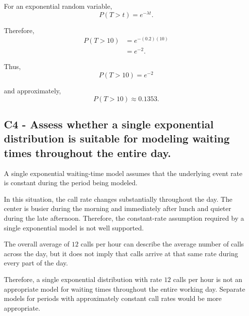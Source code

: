 {	For an exponential random variable,
	\[
	P(T>t)=e^{-\lambda t}.
	\]
	
	Therefore,
	\[
	\begin{aligned}
		P(T>10)
		&=e^{-(0.2)(10)}\\
		&=e^{-2}.
	\end{aligned}
	\]
	
	Thus,
	\[
	\boxed{
		P(T>10)=e^{-2}
	}
	\]
	
	and approximately,
	\[
	P(T>10)\approx0.1353.
	\]
	

	\label{subsec:technical-support-waiting-time-c4-c}
	\subsection*{C4 - Assess whether a single exponential distribution is suitable for modeling waiting times throughout the entire day. }
	
	A single exponential waiting-time model assumes that the underlying event rate is constant during the period being modeled.
	
	In this situation, the call rate changes substantially throughout the day. The center is busier during the morning and immediately after lunch and quieter during the late afternoon. Therefore, the constant-rate assumption required by a single exponential model is not well supported.
	
	The overall average of $12$ calls per hour can describe the average number of calls across the day, but it does not imply that calls arrive at that same rate during every part of the day.
	
	Therefore, a single exponential distribution with rate $12$ calls per hour is not an appropriate model for waiting times throughout the entire working day. Separate models for periods with approximately constant call rates would be more appropriate.

	}


